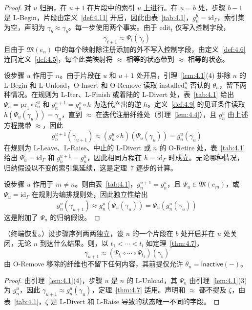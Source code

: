 \begin{proof}
对 $u$ 归纳，在 $u + 1$ 在片段中的索引 $u$ 上进行。在 $u = b$ 处，步骤 $b - 1$ 是 L-Begin，片段由定义~\ref{def:4.11} 开启，因此由表~\ref{tab:4.1}，$g^b_n = \mathrm{id}_\Gamma$，索引集为空，声明为 $\gamma_b \approx \gamma_b$。每一步使用两个事实。由于 $\mathrm{edit}_t$ 仅写入控制字段，
\[
\gamma_{t+1} \approx \Psi_t(\gamma_t)
\]
且由于 $\mathfrak{M}(e_n)$ 中的每个映射除注册添加的外不写入控制字段，由定义~\ref{def:4.6} 连同定义~\ref{def:4.5}，每个此类映射将 $\approx$-相等的状态带到 $\approx$-相等的状态。

设步骤 $u$ 作用于 $n$。由于片段在 $u$ 和 $u + 1$ 处开启，引理~\ref{lem:4.1}(4) 排除 $n$ 的 L-Begin 和 L-Unload，O-Insert 和 O-Remove 读取 $\mathrm{installed}^u_n$ 否认的 $\theta_n$，留下两种情况。在规则为 L-Iter、L-Finish 或着陆的 L-Divert 处，表~\ref{tab:4.1} 给出 $\Psi_u = \mathrm{pr}_1 \circ i^u_n$ 和 $g^{u+1}_n = g^u_n \circ h$ 为迭代产出的逆 $h$。定义~\ref{def:4.9} 的见证条件读取 $h(\Psi_u(\gamma_u)) = \gamma_u$，直到 $\approx$ 在迭代注册纤维处（引理~\ref{lem:4.4}），且 $g^u_n$ 由上述方程携带 $\approx$，因此
\[
g^{u+1}_n(\gamma_{u+1}) \approx (g^u_n \circ h)(\Psi_u(\gamma_u)) = g^u_n(\gamma_u)
\]
在规则为 L-Leave、L-Raise、中止的 L-Divert 或 $n$ 的 O-Retire 处，表~\ref{tab:4.1} 给出 $\Psi_u = \mathrm{id}_\Gamma$ 和 $g^{u+1}_n = g^u_n$，因此相同方程在 $h = \mathrm{id}_\Gamma$ 时成立。无论哪种情况，归纳假设以不变的索引集延续，这是定理~7 逐步的计算。

设步骤 $u$ 作用于 $m \neq n$。则由表~\ref{tab:4.1}，$g^{u+1}_n = g^u_n$，且 $\Psi_u \in \mathfrak{M}(e_m)$，或 $\Psi_u = \mathrm{id}_\Gamma$ 在规则为编排规则处，因此独立性给出
\[
g^u_n(\gamma_{u+1}) \approx g^u_n(\Psi_u(\gamma_u)) = \Psi_u(g^u_n(\gamma_u))
\]
这是附加了 $\Psi_u$ 的归纳假设。
\end{proof}

\begin{corollary}\label{cor:4.1}
（终端恢复。）设步骤序列两两独立，设 $n$ 的一个片段在 $b$ 处开启并在 $u$ 处关闭，无论 $n$ 到达什么结果。则，以 $t_1 < \cdots < t_l$ 如定理~\ref{thm:4.7}，
\begin{equation}\label{eq:4.26}
\gamma_{u+1} \approx (\Psi_{t_l} \circ \cdots \circ \Psi_{t_1})(\gamma_b)
\end{equation}
由 O-Remove 移除的纤维也不留下任何内容，其前提仅允许 $\theta_n = \mathsf{Inactive}(-)$。
\end{corollary}

\begin{proof}
由引理~\ref{lem:4.1}(4)，步骤 $u$ 是 $n$ 的 L-Unload，其 $\Psi_u$ 由引理~\ref{lem:4.1}(3) 为 $g^u_n$，因此 $\gamma_{u+1} \approx g^u_n(\gamma_u)$，定理~\ref{thm:4.7} 适用。声明和 $\approx$ 都不提及 $\zeta$，由表~\ref{tab:4.1}，$\zeta$ 是 L-Divert 和 L-Raise 导致的状态唯一不同的字段。
\end{proof}

